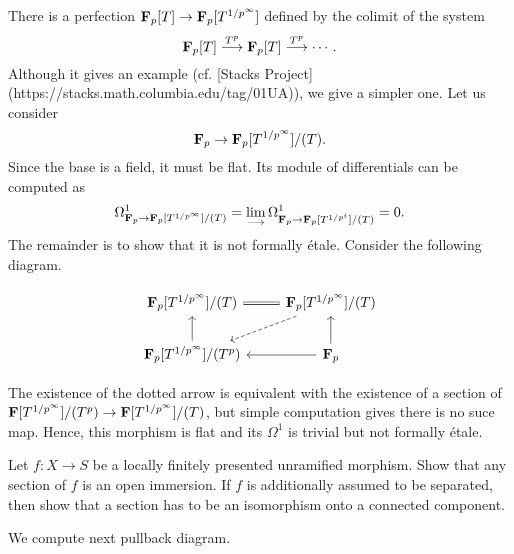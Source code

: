 \documentclass{amsart}
\begin{document}
\proof There is a perfection $\mathbf{F}_{p}[T] \to \mathbf{F}_{p}[T^{1/p^{\infty}}]$ defined by the colimit of the system
$$
\mathbf{F}_{p}[T] \overset{T^{p}}{\longrightarrow} \mathbf{F}_{p}[T] \overset{T^{p}}{\longrightarrow} \cdots.
$$
Although it gives an example (cf. [Stacks Project](https://stacks.math.columbia.edu/tag/01UA)), we give a simpler one. Let us consider
$$
\mathbf{F}_{p} \to \mathbf{F}_{p}[T^{1/p^{\infty}}]/(T).
$$
Since the base is a field, it must be flat. Its module of differentials can be computed as
$$
\Omega^{1}_{\mathbf{F}_{p} \to \mathbf{F}_{p}[T^{1/p^{\infty}}]/(T)} = \lim_{\longrightarrow} \Omega^{1}_{\mathbf{F}_{p} \to \mathbf{F}_{p}[T^{1/p^{i}}]/(T)} = 0.
$$
The remainder is to show that it is not formally étale. Consider the following diagram.

\[\begin{tikzcd}
	{\mathbf{F}_p[T^{1/p^\infty}]/(T)} & {\mathbf{F}_p[T^{1/p^\infty}]/(T)} \\
	{\mathbf{F}_p[T^{1/p^\infty}]/(T^p)} & {\mathbf{F}_p}
	\arrow[from=2-2, to=1-2]
	\arrow[from=2-2, to=2-1]
	\arrow[Rightarrow, no head, from=1-2, to=1-1]
	\arrow[dashed, from=1-2, to=2-1]
	\arrow[from=2-1, to=1-1]
\end{tikzcd}\]

The existence of the dotted arrow is equivalent with the existence of a section of $\mathbf{F}[T^{1/p^{\infty}}]/(T^{p}) \to \mathbf{F}[T^{1/p^{\infty}}]/(T)$, but simple computation gives there is no suce map. Hence, this morphism is flat and its $\Omega^{1}$ is trivial but not formally étale.

\newpage

\begin{problem}
    Let $f:X \to S$ be a locally finitely presented unramified morphism. Show that any section of $f$ is an open immersion. If $f$ is additionally assumed to be separated, then show that a section has to be an isomorphism onto a connected component.
\end{problem}

\proof We compute next pullback diagram.
\end{document}
